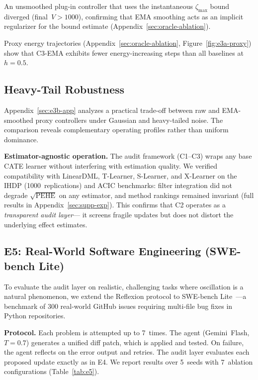 \documentclass{article}
\begin{document}
An unsmoothed plug-in controller that uses the instantaneous
$\zeta_{\max}$ bound diverged (final~$V > 1000$), confirming that
EMA smoothing acts as an implicit regularizer for the bound estimate
(Appendix~\ref{sec:oracle-ablation}).

Proxy energy trajectories (Appendix~\ref{sec:oracle-ablation},
Figure~\ref{fig:e3a-proxy}) show that C3-EMA exhibits fewer
energy-increasing steps than all baselines at $h{=}0.5$.


\subsection{Heavy-Tail Robustness}
\label{sec:e3b}

Appendix~\ref{sec:e3b-app} analyzes a practical trade-off between
raw and EMA-smoothed proxy controllers under Gaussian and heavy-tailed
noise. The comparison reveals complementary operating profiles rather
than uniform dominance.


\textbf{Estimator-agnostic operation.}
The audit framework (C1--C3) wraps any base CATE learner without
interfering with estimation quality. We verified compatibility with
LinearDML, T-Learner, S-Learner, and X-Learner on the IHDP
(1000~replications) and ACIC benchmarks: filter integration did not
degrade $\sqrt{\mathrm{PEHE}}$ on any estimator, and method rankings
remained invariant (full results in Appendix~\ref{sec:supp-exp}).
This confirms that C2 operates as a \emph{transparent audit layer}---
it screens fragile updates but does not distort the underlying
effect estimates.

\subsection{E5: Real-World Software Engineering (SWE-bench Lite)}
\label{sec:e5}

To evaluate the audit layer on realistic, challenging tasks where
oscillation is a natural phenomenon, we extend the Reflexion protocol
to SWE-bench Lite~\cite{jimenez2024swebench}---a benchmark of 300
real-world GitHub issues requiring multi-file bug fixes in Python
repositories.

\textbf{Protocol.}
Each problem is attempted up to 7~times. The agent (Gemini~Flash,
$T{=}0.7$) generates a unified diff patch, which is applied and tested.
On failure, the agent reflects on the error output and retries.
The audit layer evaluates each proposed update exactly as in E4.
We report results over 5~seeds with 7~ablation configurations
(Table~\ref{tab:e5}).
\end{document}
